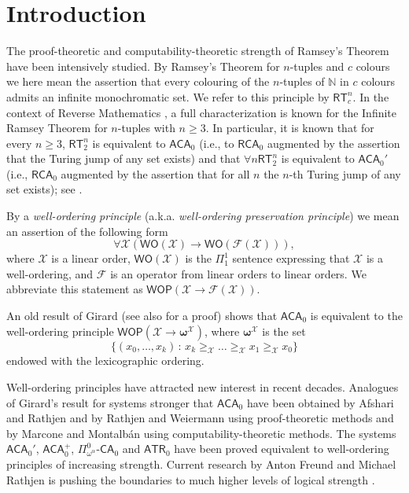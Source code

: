 \documentclass{amsart}
\newcommand\Nat{\mathbb{N}}
\newcommand\RCA{\mathsf{RCA}}
\newcommand\ACA{\mathsf{ACA}}
\newcommand\ATR{\mathsf{ATR}}
\newcommand\RT{\mathsf{RT}}
\newcommand\CA{\mathsf{CA}}
\newcommand\WO{\mathsf{WO}}
\newcommand\WOP{\mathsf{WOP}}
\newcommand{\LoX}{\mathcal{X}}
\newcommand\boldomega{\pmb{\omega}}
\begin{document}
\section{Introduction}
The proof-theoretic and computability-theoretic strength of Ramsey's Theorem have been intensively 
studied. By Ramsey's Theorem for $n$-tuples and $c$ colours we here mean the assertion that every colouring of 
the $n$-tuples of $\Nat$ in $c$ colours admits an infinite monochromatic set. We refer to this 
principle by $\RT^n_c$. In the context of Reverse Mathematics \cite{Sim:99}, 
a full characterization is known for the 
Infinite Ramsey Theorem for $n$-tuples with $n\geq 3$. In particular, it is known that for every 
$n\geq 3$, $\RT^n_2$ is equivalent to $\ACA_0$ (i.e., to $\RCA_0$ augmented by the assertion that the 
Turing jump of any set exists) and that $\forall n \RT^n_2$ is equivalent to 
$\ACA_0'$ (i.e., $\RCA_0$ augmented by the assertion that for all $n$ the $n$-th Turing jump
of any set exists); see \cite{}.  

By a {\em well-ordering principle\/} (a.k.a. {\em well-ordering preservation principle}) we mean an assertion of the following form 
$$\forall \LoX (\WO(\LoX)\to \WO(\mathcal{F}(\LoX))),$$ 
where $\LoX$ is a linear order, $\WO(\LoX)$ is the $\Pi_1^1$ sentence expressing that $\LoX$ is a well-ordering, and $\mathcal{F}$ is an operator from linear orders to 
linear orders. We abbreviate this statement as $\WOP(\LoX\to \mathcal{F}(\LoX))$. 

An old result of
Girard \cite{Gir:87} (see also \cite{Hir:94} for a proof) 
shows that $\ACA_0$ is equivalent to the well-ordering principle $\WOP(\LoX\to \boldomega^\LoX)$, 
where $\boldomega^\LoX$ is the set 
$$\{ (x_0, \dots, x_k) \,:\, x_k \geq_\LoX \dots \geq_\LoX x_1 \geq_\LoX x_0 \}$$ endowed with the lexicographic ordering. 

Well-ordering principles have 
attracted new interest in recent decades. Analogues of Girard's result for systems stronger that $\ACA_0$ 
have been obtained by Afshari and Rathjen \cite{Afs-Rat:09} and by Rathjen and Weiermann \cite{Rat-Wei:11}
using proof-theoretic methods and by Marcone and Montalb\'{a}n 
\cite{Mar-Mon:11} using computability-theoretic methods. 
The systems $\ACA_0'$, $\ACA_0^+$, $\Pi_{\omega^\alpha}^0$-$\CA_0$
and $\ATR_0$ have been proved equivalent to well-ordering principles of increasing strength. 
Current research by Anton Freund and Michael Rathjen is pushing the boundaries to much higher levels of 
logical strength \cite{Rat:pre}. 
\end{document}
